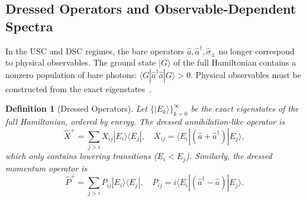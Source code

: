 \documentclass[reprint, floatfix, superscriptaddress, amsmath, amssymb, longbibliography]{revtex4-2}
\newtheorem{definition}[theorem]{Definition}
\begin{document}
\subsection{Dressed Operators and Observable-Dependent Spectra}
\label{sec:dressed_operators}

In the USC and DSC regimes, the bare operators $\hat{a}, \hat{a}^\dagger, \hat{\sigma}_\pm$ no longer correspond to physical observables. The ground state $|G\rangle$ of the full Hamiltonian contains a nonzero population of bare photons: $\langle G | \hat{a}^\dagger\hat{a} | G \rangle > 0$. Physical observables must be constructed from the exact eigenstates~\cite{Kockum2019, Napoli2024}.

\begin{definition}[Dressed Operators]
\label{def:dressed_operators}
Let $\{|E_k\rangle\}_{k=0}^{\infty}$ be the exact eigenstates of the full Hamiltonian, ordered by energy. The \emph{dressed annihilation-like operator} is
\begin{equation}
\hat{X}^{+} = \sum_{j > i} X_{ij} |E_i\rangle \langle E_j|, \quad X_{ij} = \langle E_i | (\hat{a} + \hat{a}^\dagger) | E_j \rangle,
\label{eq:dressed_X}
\end{equation}
which only contains lowering transitions ($E_i < E_j$). Similarly, the dressed momentum operator is
\begin{equation}
\hat{P}^{+} = \sum_{j > i} P_{ij} |E_i\rangle \langle E_j|, \quad P_{ij} = i\langle E_i | (\hat{a}^\dagger - \hat{a}) | E_j \rangle.
\label{eq:dressed_P}
\end{equation}
\end{definition}
\end{document}
